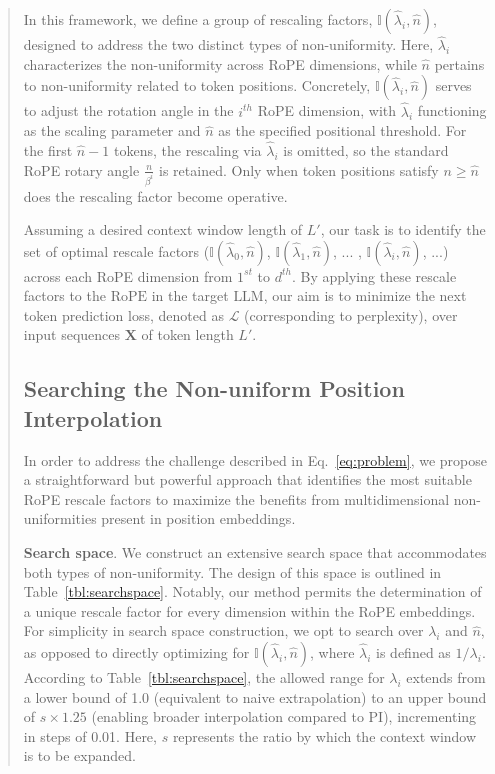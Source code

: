 \begin{abstract}
In this framework, we define a group of rescaling factors, $\mathbb{I}(\hat{\lambda}_{i},\hat{n})$, designed to address the two distinct types of non-uniformity. Here, $\hat{\lambda}_i$ characterizes the non-uniformity across RoPE dimensions, while $\hat{n}$ pertains to non-uniformity related to token positions. Concretely, $\mathbb{I}(\hat{\lambda}_{i},\hat{n})$ serves to adjust the rotation angle in the $i^{th}$ RoPE dimension, with $\hat{\lambda}_i$ functioning as the scaling parameter and $\hat{n}$ as the specified positional threshold. For the first $\hat{n} - 1$ tokens, the rescaling via $\hat{\lambda}_i$ is omitted, so the standard RoPE rotary angle $\frac{n}{\beta^i}$ is retained. Only when token positions satisfy $n \geq \hat{n}$ does the rescaling factor become operative.

Assuming a desired context window length of $L'$, our task is to identify the set of optimal rescale factors ($\mathbb{I}(\hat{\lambda}_{0},\hat{n})$, $\mathbb{I}(\hat{\lambda}_{1},\hat{n})$, ... , $\mathbb{I}(\hat{\lambda}_{i},\hat{n})$, ...) across each RoPE dimension from $1^{st}$ to $d^{th}$. By applying these rescale factors to the $\text{RoPE}$ in the target $\text{LLM}$, our aim is to minimize the next token prediction loss, denoted as $\mathcal{L}$ (corresponding to perplexity), over input sequences $\mathbf{X}$ of token length $L'$.

\subsection{Searching the Non-uniform Position Interpolation}

In order to address the challenge described in Eq.~\ref{eq:problem}, we propose a straightforward but powerful approach that identifies the most suitable RoPE rescale factors to maximize the benefits from multidimensional non-uniformities present in position embeddings.

\textbf{Search space}. We construct an extensive search space that accommodates both types of non-uniformity. The design of this space is outlined in Table~\ref{tbl:searchspace}. Notably, our method permits the determination of a unique rescale factor for every dimension within the RoPE embeddings. For simplicity in search space construction, we opt to search over $\lambda_i$ and $\hat{n}$, as opposed to directly optimizing for $\mathbb{I}(\hat{\lambda}_{i},\hat{n})$, where $\hat{\lambda}_{i}$ is defined as $1/\lambda_i$. According to Table~\ref{tbl:searchspace}, the allowed range for $\lambda_i$ extends from a lower bound of 1.0 (equivalent to naive extrapolation) to an upper bound of $s\times1.25$ (enabling broader interpolation compared to PI), incrementing in steps of 0.01. Here, $s$ represents the ratio by which the context window is to be expanded.


\end{abstract}
